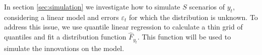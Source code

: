 In section \ref{sec:simulation} we investigate how to simulate $S$ scenarios of $y_t$, considering a linear model and errors $\varepsilon_t$ for which the distribution is unknown. To address this issue, we use quantile linear regression to calculate a thin grid of quantiles and fit a distribution function $\hat{F}_{y_t}$. This function will be used to simulate the innovations on the model.